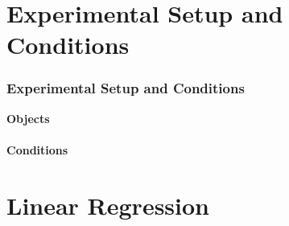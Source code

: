 \documentclass{beamer}
\begin{document}
\section{ Experimental Setup and Conditions}

\begin{frame}

\begin{center}
\frametitle{Experimental Setup and Conditions}
\centering \textbf{Objects}\\
\\
\centering \textbf{Conditions}\\
\end{center}
\end{frame}
%
%
%



\section{ Linear Regression}
\end{document}
